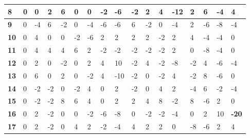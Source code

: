 \begin{longtable}[c]{|l|l|l|l|l|l|l|l|l|l|l|l|l|l|l|l|l|}
\textbf{8}  & 0          & 0          & 2          & 6          & 0          & 0          & -2         & -6         & -2         & 2          & 4           & -12         & 2           & 6           & -4          & 4           \\ \hline
\textbf{9}  & 0          & -4         & 6          & -2         & 0          & -4         & -6         & -6         & 6          & -2         & 0           & -4          & 2           & -6          & -8          & -4          \\ \hline
\textbf{10} & 0          & 4          & 0          & 0          & -2         & -6         & 2          & 2          & 2          & 2          & -2          & 2           & 4           & -4          & -4          & 0           \\ \hline
\textbf{11} & 0          & 4          & 4          & 4          & 6          & 2          & -2         & -2         & -2         & -2         & -2          & 2           & 0           & -8          & -4          & 0           \\ \hline
\textbf{12} & 0          & 2          & 0          & -2         & 0          & 2          & 4          & 10         & -2         & 4          & -2          & -8          & -2          & 4           & -6          & -4          \\ \hline
\textbf{13} & 0          & 6          & 0          & 2          & 0          & -2         & 4          & -10        & -2         & 0          & -2          & 4           & -2          & 8           & -6          & 0           \\ \hline
\textbf{14} & 0          & -2         & -2         & 0          & -2         & 4          & 0          & 2          & -2         & 0          & 4           & 2           & -4          & 6           & -2          & -4          \\ \hline
\textbf{15} & 0          & -2         & -2         & 8          & 6          & 4          & 0          & 2          & 2          & 4          & 8           & -2          & 8           & -6          & 2           & 0           \\ \hline
\textbf{16} & 0          & 2          & -2         & 0          & 0          & -2         & -6         & -8         & 0          & -2         & -2          & -4          & 0           & 2           & 10          & \textbf{-20}         \\ \hline
\textbf{17} & 0          & 2          & -2         & 0          & 4          & 2          & -2         & -4         & 4          & 2          & 2           & 0           & -8          & -6          & 2           & 4           \\ \hline

\end{longtable}
